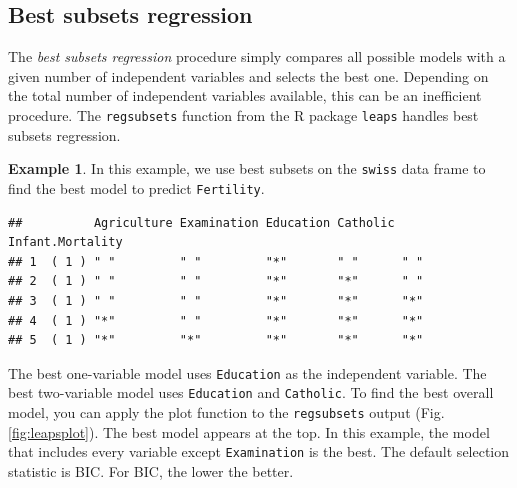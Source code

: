 \documentclass[
]{book}
\newenvironment{Shaded}{\begin{snugshade}}{\end{snugshade}}
\newcommand{\AttributeTok}[1]{\textcolor[rgb]{0.13,0.29,0.53}{#1}}
\newcommand{\FunctionTok}[1]{\textcolor[rgb]{0.13,0.29,0.53}{\textbf{#1}}}
\newcommand{\NormalTok}[1]{#1}
\newcommand{\OtherTok}[1]{\textcolor[rgb]{0.56,0.35,0.01}{#1}}
\newcommand{\SpecialCharTok}[1]{\textcolor[rgb]{0.81,0.36,0.00}{\textbf{#1}}}
\theoremstyle{definition}
\theoremstyle{definition}
\newtheorem{example}{Example}[chapter]
\theoremstyle{definition}
\theoremstyle{definition}
\theoremstyle{remark}
\begin{document}
\subsection*{Best subsets regression}\label{best-subsets-regression}

The \emph{best subsets regression} procedure simply compares all possible models with a given number of independent variables and selects the best one. Depending on the total number of independent variables available, this can be an inefficient procedure. The \texttt{regsubsets} function from the R package \texttt{leaps} handles best subsets regression.

\begin{examplebox}

\begin{example}
In this example, we use best subsets on the \texttt{swiss} data frame to find the best model to predict \texttt{Fertility}.

\begin{Shaded}
\end{Shaded}

\begin{verbatim}
##          Agriculture Examination Education Catholic Infant.Mortality
## 1  ( 1 ) " "         " "         "*"       " "      " "             
## 2  ( 1 ) " "         " "         "*"       "*"      " "             
## 3  ( 1 ) " "         " "         "*"       "*"      "*"             
## 4  ( 1 ) "*"         " "         "*"       "*"      "*"             
## 5  ( 1 ) "*"         "*"         "*"       "*"      "*"
\end{verbatim}

The best one-variable model uses \texttt{Education} as the independent variable. The best two-variable model uses \texttt{Education} and \texttt{Catholic}. To find the best overall model, you can apply the plot function to the \texttt{regsubsets} output (Fig. \ref{fig:leapsplot}). The best model appears at the top. In this example, the model that includes every variable except \texttt{Examination} is the best. The default selection statistic is BIC. For BIC, the lower the better.
\end{example}

\end{examplebox}
\end{document}
